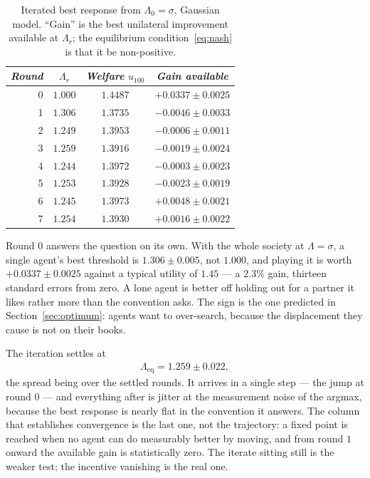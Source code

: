 \documentclass[sigconf,anonymous]{aamas}
\newcommand{\Leq}{\Lambda_{\mathrm{eq}}}
\begin{document}
\begin{table}[t]
  \caption{Iterated best response from $\Lambda_0 = \sigma$, Gaussian model.
  ``Gain'' is the best unilateral improvement available at $\Lambda_r$; the
  equilibrium condition~\eqref{eq:nash} is that it be non-positive.}
  \label{tab:nash}
  \begin{tabular}{rccc}\toprule
    \textit{Round} & $\Lambda_r$ & \textit{Welfare} $u_{100}$ & \textit{Gain available} \\ \midrule
    0 & $1.000$ & $\mathbf{1.4487}$ & $\mathbf{+0.0337 \pm 0.0025}$ \\
    1 & $1.306$ & $1.3735$ & $-0.0046 \pm 0.0033$ \\
    2 & $1.249$ & $1.3953$ & $-0.0006 \pm 0.0011$ \\
    3 & $1.259$ & $1.3916$ & $-0.0019 \pm 0.0024$ \\
    4 & $1.244$ & $1.3972$ & $-0.0003 \pm 0.0023$ \\
    5 & $1.253$ & $1.3928$ & $-0.0023 \pm 0.0019$ \\
    6 & $1.245$ & $1.3973$ & $+0.0048 \pm 0.0021$ \\
    7 & $1.254$ & $1.3930$ & $+0.0016 \pm 0.0022$ \\ \bottomrule
  \end{tabular}
\end{table}

Round $0$ answers the question on its own. With the whole society at
$\Lambda = \sigma$, a single agent's best threshold is $1.306 \pm 0.005$, not
$1.000$, and playing it is worth $+0.0337 \pm 0.0025$ against a typical utility
of $1.45$ --- a $2.3\%$ gain, thirteen standard errors from zero. A lone agent is
better off holding out for a partner it likes rather more than the convention
asks. The sign is the one predicted in Section~\ref{sec:optimum}: agents want to
over-search, because the displacement they cause is not on their books.

The iteration settles at
%
\begin{align}
  \Leq = 1.259 \pm 0.022 ,
  \label{eq:leq}
\end{align}
%
the spread being over the settled rounds. It arrives in a single step --- the
jump at round $0$ --- and everything after is jitter at the measurement noise of
the argmax, because the best response is nearly flat in the convention it
answers. The column that establishes convergence is the last one, not the
trajectory: a fixed point is reached when no agent can do measurably better by
moving, and from round $1$ onward the available gain is statistically zero. The
iterate sitting still is the weaker test; the incentive vanishing is the real
one.
\end{document}
